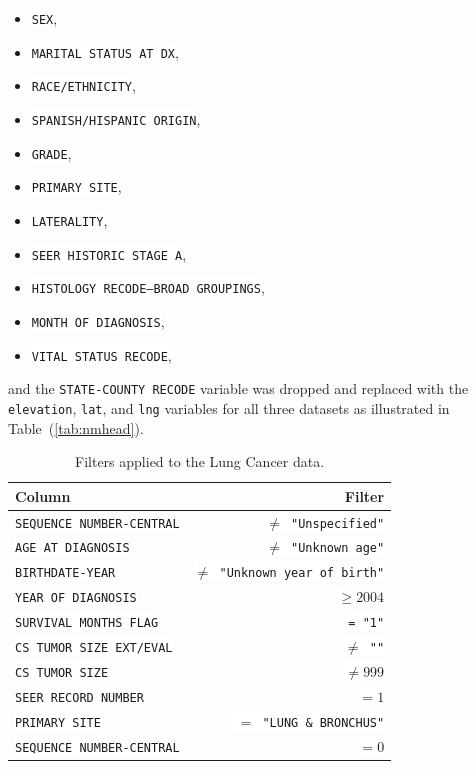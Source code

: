 \documentclass[a4paper,11pt]{article}
\newcommand{\codewhite}[1]{\colorbox{white}{\texttt{#1}}}
\begin{document}
\begin{itemize}[noitemsep]
\item \codewhite{SEX},
\item  \codewhite{MARITAL STATUS AT DX},
\item \codewhite{RACE/ETHNICITY},
\item \codewhite{SPANISH/HISPANIC ORIGIN},
\item \codewhite{GRADE},
\item \codewhite{PRIMARY SITE},
\item \codewhite{LATERALITY},
\item \codewhite{SEER HISTORIC STAGE A},
\item \codewhite{HISTOLOGY RECODE--BROAD GROUPINGS},
\item \codewhite{MONTH OF DIAGNOSIS},
\item  \codewhite{VITAL STATUS RECODE},
\end{itemize}
and the \codewhite{STATE-COUNTY RECODE} variable was dropped and replaced with the \codewhite{elevation}, \codewhite{lat}, and \codewhite{lng} variables for all three datasets as illustrated in Table~(\ref{tab:nmhead}).









\begin{table}[tbp]
\begin{center}
\begin{tabular}{lr}
\toprule
 Column &  Filter \\
\midrule
\codewhite{SEQUENCE NUMBER-CENTRAL} & \codewhite{$\neq$ "Unspecified"} \\
\codewhite{AGE AT DIAGNOSIS} & \codewhite{$\neq$ "Unknown age"} \\
\codewhite{BIRTHDATE-YEAR} & \codewhite{$\neq$ "Unknown year of birth"} \\
\codewhite{YEAR OF DIAGNOSIS} & \codewhite{$\geq 2004$} \\
\codewhite{SURVIVAL MONTHS FLAG} & \codewhite{= "1"}\\
\codewhite{CS TUMOR SIZE EXT/EVAL} & \codewhite{$\neq$ ""} \\
\codewhite{CS TUMOR SIZE} & \codewhite{$\neq 999$} \\
\codewhite{SEER RECORD NUMBER} & \codewhite{$= 1$} \\
\codewhite{PRIMARY SITE} & \codewhite{ $=$ "LUNG \& BRONCHUS"} \\
\codewhite{SEQUENCE NUMBER-CENTRAL} & \codewhite{$=0$} \\
\bottomrule
\end{tabular}
\caption{\label{tab:lungfilter} Filters applied to the Lung Cancer data.}
\end{center}
\end{table}
\end{document}
